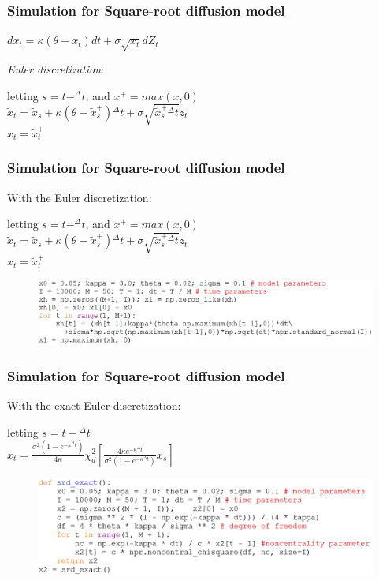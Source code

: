 \documentclass{beamer}
\begin{document}
\begin{frame}
\frametitle{Simulation for Square-root diffusion model}
\begin{center}
	$dx_{t} = \kappa(\theta-x_{t})dt + \sigma\sqrt{x_{t}}dZ_{t}$
\end{center}
\emph{Euler discretization}:
\begin{center}
	letting $s = t-^{\Delta}t$, and $x^{+} = max(x,0)$\\[3mm]
	$\tilde{x}_{t} = \tilde{x}_{s} + \kappa(\theta-\tilde{x}_{s}^{+}){^{\Delta}t} + \sigma\sqrt{\tilde{x}_{s}^{+}{^{\Delta}t}}z_{t}$\\[3mm]
	$x_{t} = \tilde{x}_{t}^{+}$
\end{center}
\end{frame}

\begin{frame}
\frametitle{Simulation for Square-root diffusion model}
With the Euler discretization:
\begin{center}
	letting $s = t-^{\Delta}t$, and $x^{+} = max(x,0)$\\[3mm]
	$\tilde{x}_{t} = \tilde{x}_{s} + \kappa(\theta-\tilde{x}_{s}^{+}){^{\Delta}t} + \sigma\sqrt{\tilde{x}_{s}^{+}{^{\Delta}t}}z_{t}$\\[3mm]
	$x_{t} = \tilde{x}_{t}^{+}$
\end{center}
\begin{figure}[H]
	\includegraphics[scale=0.4]{square_root_diffusion.png}
\end{figure}
\end{frame}

\begin{frame}
\frametitle{Simulation for Square-root diffusion model}
With the exact Euler discretization:
\begin{center}
	letting $s = t-{^{\Delta}t}$\\[3mm]
	$x_{t} = \frac{\sigma^{2}(1-e^{-\kappa{^{\Delta}t}})}{4\kappa}\chi_{d}^{2}[\frac{4\kappa e^{-\kappa{^{\Delta}t}}}{\sigma^{2}(1-e^{-\kappa{^{\Delta}t}})}x_{s}]$
\end{center}
\begin{figure}[H]
	\includegraphics[scale=0.4]{square_root_diffusion_exact.png}
\end{figure}
\end{frame}
\end{document}
